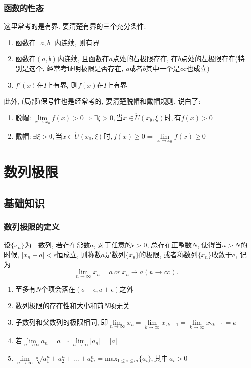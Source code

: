 \subsection{函数的性态}
这里常考的是有界. 要清楚有界的三个充分条件:
\begin{enumerate}
    \item 函数在$ [a,b] $内连续, 则有界
    \item 函数在$ (a,b) $内连续, 且函数在$ a $点处的右极限存在, 在$ b $点处的左极限存在(特别是这个, 经常考证明极限是否存在, $ a $或者$ b $其中一个是$ \infty $也成立)
    \item $ f'(x) $在$ I $上有界, 则$ f(x) $在$ I $上有界
\end{enumerate}\par
此外, (局部)保号性也是经常考的, 要清楚脱帽和戴帽规则, 说白了:
\begin{enumerate}
    \item 脱帽: $ \lim\limits_{x \rightarrow x_{0}}f(x)>0\Rightarrow \exists \xi>0, \text{当}x\in \mathring{U}(x_{0}, \xi)\text{时}, \text{有}f(x)>0 $
    \item 戴帽: $ \exists \xi>0, \text{当}x\in \mathring{U}(x_{0}, \xi)\text{时}, f(x)\ge 0\Rightarrow \lim\limits_{x \rightarrow x_{0}}f(x)\ge 0 $
\end{enumerate}
\chapter{数列极限}
\section{基础知识}
\subsection{数列极限的定义}
设$ \{x_{n}\} $为一数列, 若存在常数$ a $, 对于任意的$ \epsilon >0 $, 总存在正整数$ N $, 使得当$ n>N $的时候, $ |x_{n}-a|<\epsilon $恒成立, 则称数$ a $是数列$ \{x_{n}\} $的极限, 或者称数列$ \{x_{n}\} $收敛于$ a $, 记为
\begin{equation*}
    \lim_{n\rightarrow \infty} x_{n} = a\ or\ x_{n}\rightarrow a(n\rightarrow \infty).
\end{equation*}\par
\begin{tcolorbox}
    \begin{enumerate}
        \item 至多有$ N $个项会落在$ (a-\epsilon,a+\epsilon) $之外
        \item 数列极限的存在性和大小和前$ N $项无关
        \item 子数列和父数列的极限相同, 即$ \lim\limits_{n \rightarrow \infty}x_{n}=\lim\limits_{k \rightarrow \infty}x_{2k-1}=\lim\limits_{k \rightarrow \infty}x_{2k+1}=a $
        \item 若$ \lim\limits_{n \rightarrow \infty}a_{n}=a\Rightarrow \lim\limits_{n \rightarrow \infty}|a_{n}|=|a| $
        \item $ \lim\limits_{n \rightarrow \infty}\sqrt[n]{a_{1}^{n}+a_{2}^{n}+...+a_{m}^{n}}=\mathrm{max}_{1\le i\le m}\{a_{i}\}, \text{其中}\ a_{i}>0 $
    \end{enumerate}
\end{tcolorbox}
